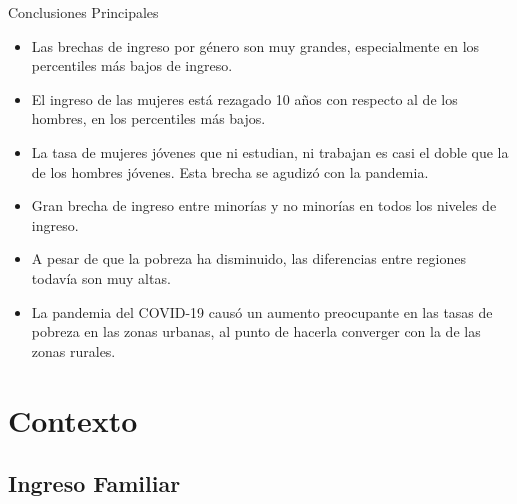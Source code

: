 \documentclass[aspectratio=169]{beamer}
\begin{document}
    
    
    \begin{frame}{Conclusiones Principales}
    
    \begin{itemize}
        \item Las brechas de ingreso por género son muy grandes, especialmente en los percentiles más bajos de ingreso.
        \item El ingreso de las mujeres está rezagado 10 años con respecto al de los hombres, en los percentiles más bajos.
        \item La tasa de mujeres jóvenes que ni estudian, ni trabajan es casi el doble que la de los hombres jóvenes. Esta brecha se agudizó con la pandemia.
    \item Gran brecha de ingreso entre minorías y no minorías  en todos los niveles de ingreso.
    \item A pesar de que la pobreza ha disminuido, las diferencias entre regiones todavía son muy altas.
    \item La pandemia del COVID-19 causó un aumento preocupante en las tasas de pobreza en las zonas urbanas, al punto de hacerla converger con la de las zonas  rurales.
    \end{itemize}

    
    \end{frame}
    
    \section{Contexto}
        
    \subsection{Ingreso Familiar}
    
\end{document}
